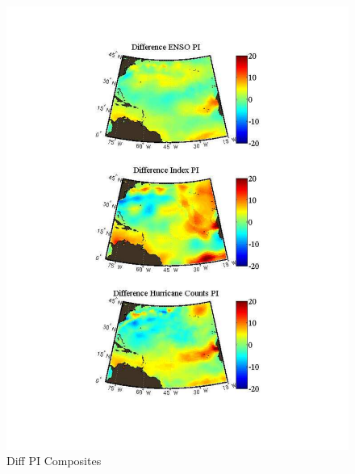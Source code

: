 \documentclass[a4paper,10pt]{article}
\begin{document}
\begin{figure}[ht]
\begin{minipage}[b]{0.6\linewidth}
\includegraphics[width=\textwidth]{figs/sensitivityResults/compositeMaps/diffPIAtlanticComposites.pdf}
\caption{Diff PI Composites}
\label{fig:figure2}
\end{minipage}
\end{figure}
\end{document}

